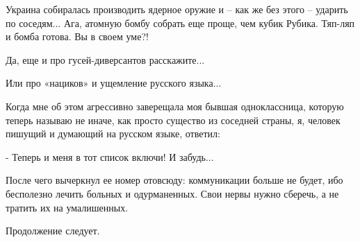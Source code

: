 Украина собиралась производить ядерное оружие и – как же без этого – ударить по
соседям... Ага, атомную бомбу собрать еще проще, чем кубик Рубика. Тяп-ляп и
бомба готова. Вы в своем уме?!

Да, еще и про гусей-диверсантов расскажите...

Или про «нациков» и ущемление русского языка...

Когда мне об этом агрессивно заверещала моя бывшая одноклассница, которую
теперь называю не иначе, как просто существо из соседней страны, я, человек
пишущий и думающий на русском языке, ответил:

- Теперь и меня в тот список включи! И забудь...

После чего вычеркнул ее номер отовсюду: коммуникации больше не будет, ибо
бесполезно лечить больных и одурманенных. Свои нервы нужно сберечь, а не
тратить их на умалишенных.

Продолжение следует.

